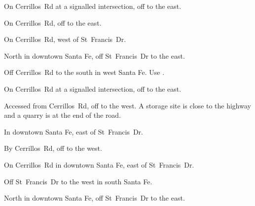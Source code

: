 
\begin{LocationList}

On Cerrillos~Rd at a signalled intersection, off  to the east.

On Cerrillos~Rd, off  to the east.

\Location{\GarageHQ \Garage}
On Cerrillos~Rd, west of  St~Francis~Dr.

\Location{\GasStation \Gas}
North in downtown Santa Fe, off  St~Francis~Dr to the east.

Off Cerrillos~Rd to the south in west Santa Fe.
Use .

On Cerrillos~Rd at a signalled intersection, off  to the east.

Accessed from Cerrillos~Rd, off  to the west.
A storage site is close to the highway and a quarry is at the end of the road.

\Location{\RecruitmentAgency \Recruitment}
In downtown Santa Fe, east of  St~Francis~Dr.

By Cerrillos~Rd, off  to the west.

On Cerrillos~Rd in downtown Santa Fe, east of  St~Francis~Dr.

\Location{\TruckService \Service}
Off  St~Francis~Dr to the west in south Santa Fe.

North in downtown Santa Fe, off  St~Francis~Dr to the east.

\end{LocationList}


